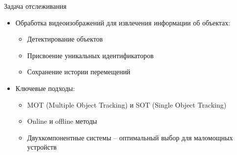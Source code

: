 \documentclass{beamer} %
\begin{document}
\begin{frame}{Задача отслеживания}
  \begin{itemize}
    \item Обработка видеоизображений для извлечения информации об объектах:
      \begin{itemize}
        \item Детектирование объектов
        \item Присвоение уникальных идентификаторов
        \item Сохранение истории перемещений
      \end{itemize}
    \item Ключевые подходы:
      \begin{itemize}
        \item MOT (Multiple Object Tracking) и SOT (Single Object Tracking)
        \item Online и offline методы
        \item Двухкомпонентные системы – оптимальный выбор для маломощных устройств
      \end{itemize}
  \end{itemize}
\end{frame}
\end{document}
